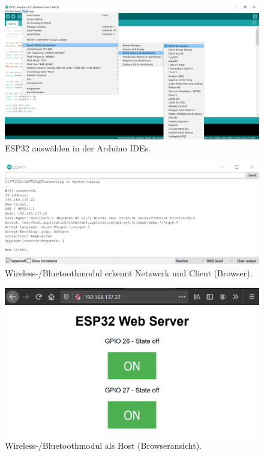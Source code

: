 \begin{figure}[H]
	\centering
	\includegraphics[width=\textwidth]{graphics/ESP32_Arduino_IDE}
	\caption{ESP32 auswählen in der Arduino IDEs.}
	\label{fig:ESP32_Arduino_IDE}
\end{figure}
%

\begin{figure}[H]
	\centering
	\includegraphics[width=\textwidth]{graphics/ESP32_Serial_Monitor}
	\caption{Wireless-/Bluetoothmodul erkennt Netzwerk und Client (Browser).}
	\label{fig:ESP32_Serial_Monitor}
\end{figure}

\begin{figure}[H]
	\centering
	\includegraphics[width=\textwidth]{graphics/ESP32_Webserver}
	\caption{Wireless-/Bluetoothmodul als Host (Browseransicht).}
	\label{fig:ESP32_Webserver}
\end{figure}